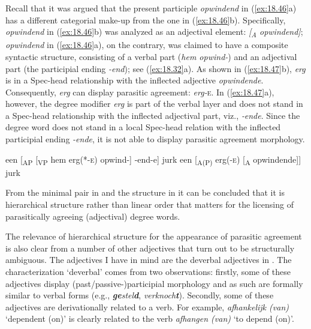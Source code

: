 \documentclass[output=paper]{langsci/langscibook}
\begin{document}
Recall that it was argued that the present participle \emph{opwindend} in
(\ref{ex:18.46}a) has a different categorial make-up from the one in
(\ref{ex:18.46}b). Specifically, \emph{opwindend} in (\ref{ex:18.46}b) was
analyzed as an adjectival element: \emph{[\textsubscript{A} opwindend]};
\emph{opwindend} in (\ref{ex:18.46}a), on the contrary, was claimed to have a
composite syntactic structure, consisting of a verbal part (\emph{hem opwind-})
and an adjectival part (the participial ending \emph{-end}); see
(\ref{ex:18.32}a). As shown in (\ref{ex:18.47}b), \emph{erg} is in a Spec-head
relationship with the inflected adjective \emph{opwindende}. Consequently,
\emph{erg} can display parasitic agreement: \emph{erg-}\textsc{e}. In
(\ref{ex:18.47}a), however, the degree modifier \emph{erg} is part of the verbal
layer and does not stand in a Spec-head relationship with the inflected
adjectival part, viz., \emph{‑ende}. Since the degree word
does not stand in a local Spec-head relation with the inflected participial
ending \emph{-ende}, it is not able to display parasitic
agreement morphology.

\ea%
    \label{ex:18.47}
	\ea een [\textsubscript{AP} [\textsubscript{VP} hem erg(*-\textsc{e}) opwind-] -end-e] jurk
	\ex een [\textsubscript{A(P)} erg(\textsc{-e}) [\textsubscript{A} opwindende]] jurk
	\z
\z

From the minimal pair in  and the structure in 
it can be concluded that it is hierarchical structure rather than linear order
that matters for the licensing of parasitically agreeing (adjectival) degree
words.

The relevance of hierarchical structure for the appearance of parasitic
agreement is also clear from a number of other adjectives that turn out to be
structurally ambiguous. The adjectives I have in mind are the deverbal
adjectives in . The characterization \enquote*{deverbal} comes
from two observations: firstly, some of these adjectives display
(past/passive-)participial morphology and as such are formally similar to
verbal forms (e.g., \emph{\textbf{ge}stel\textbf{d}},
\emph{verknoch\textbf{t}}). Secondly, some of these adjectives are
derivationally related to a verb. For example, \emph{afhankelijk (van)}
\enquote*{dependent (on)} is clearly related to the verb \emph{afhangen (van)}
\enquote*{to depend (on)}.
\end{document}
